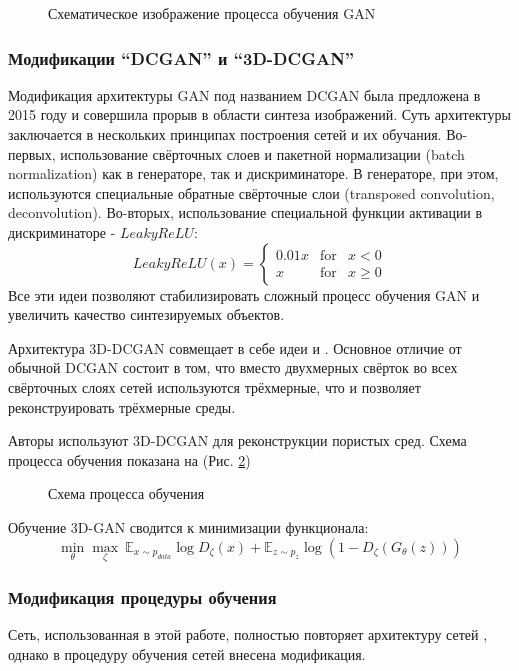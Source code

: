 			\begin{figure}[h!]
				\caption{Схематическое изображение процесса обучения GAN}
				\label{2-gan-training}
			\end{figure}
	
		\subsubsection{Модификации ``DCGAN'' и ``3D-DCGAN''}
			Модификация архитектуры GAN под названием DCGAN \cite{Radford} была предложена в 2015 году и совершила прорыв в области синтеза изображений. Суть архитектуры заключается в нескольких принципах построения сетей и их обучания. Во-первых, использование свёрточных слоев и пакетной нормализации (batch normalization)  как в генераторе, так и дискриминаторе. В генераторе, при этом, используются специальные обратные свёрточные слои (transposed convolution, deconvolution). Во-вторых, использование специальной функции активации в дискриминаторе - $LeakyReLU$:
			\[ LeakyReLU(x) = \left \{ \begin{array}{rcl} 0.01 x & \mbox{for} & x < 0\\ x & \mbox{for} & x \ge 0\end{array} \right .\]  
			Все эти идеи позволяют стабилизировать сложный процесс обучения GAN и увеличить качество синтезируемых объектов.
			
			Архитектура 3D-DCGAN совмещает в себе идеи \cite{Radford} и \cite{Wu}. Основное отличие от обычной DCGAN состоит в том, что вместо двухмерных свёрток во всех свёрточных слоях сетей используются трёхмерные, что и позволяет реконструировать трёхмерные среды.
			
			Авторы \cite{Mosser} используют 3D-DCGAN для реконструкции пористых сред. Схема процесса обучения показана на (Рис. \ref{2-gan-scheme})
			
			\begin{figure}[h!]
				\caption{Схема процесса обучения}
				\label{2-gan-scheme}
			\end{figure}
		
			Обучение 3D-GAN сводится к минимизации функционала:
			\[ \underset{\theta}{\min} \underset{\zeta}{\max} \ \mathbb{E}_{x \sim p_{data}}\log D_\zeta(x) + \mathbb{E}_{z \sim p_{z}} \log (1 - D_\zeta(G_\theta(z))) \]
		
		\subsubsection{Модификация процедуры обучения}
			Сеть, использованная в этой работе, полностью повторяет архитектуру сетей \cite{Mosser}, однако в процедуру обучения сетей внесена модификация.
			
